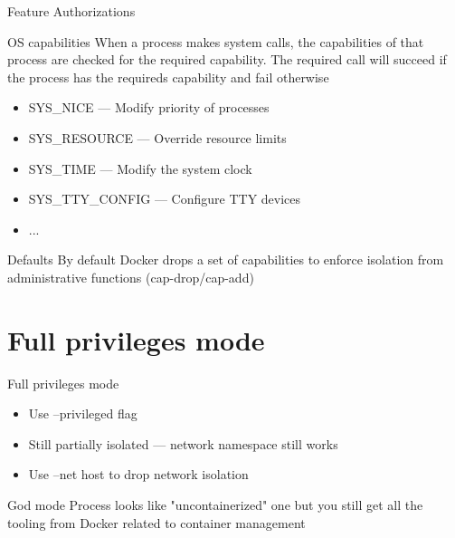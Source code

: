 \begin{frame}{Feature Authorizations}
  \begin{block}{OS capabilities}
  When a process makes system calls, the capabilities of that process are checked for the required capability. The required call will succeed if the process has the requireds capability and fail otherwise
  \end{block}
  \begin{itemize}
    \item SYS\_NICE --- Modify priority of processes
    \item SYS\_RESOURCE --- Override resource limits
    \item SYS\_TIME --- Modify the system clock
    \item SYS\_TTY\_CONFIG --- Configure TTY devices 
    \item ...
  \end{itemize}  
  \begin{exampleblock}{Defaults}
  By default Docker drops a set of capabilities to enforce isolation from administrative functions (cap-drop/cap-add)
  \end{exampleblock}
\end{frame}

\section{Full privileges mode}

\begin{frame}{Full privileges mode}
  \begin{itemize}
    \item Use --privileged flag
    \item Still partially isolated --- network namespace still works
    \item Use --net host to drop network isolation
  \end{itemize}
  \begin{exampleblock}{God mode}
  Process looks like "uncontainerized" one but you still get all the tooling from Docker related to container management
  \end{exampleblock}
\end{frame}




